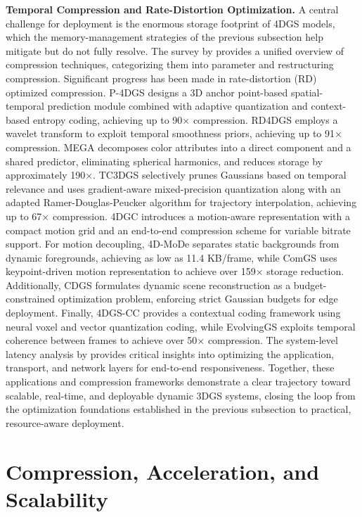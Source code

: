 \documentclass[11pt]{article}
\begin{document}
\textbf{Temporal Compression and Rate-Distortion Optimization.} A central challenge for deployment is the enormous storage footprint of 4DGS models, which the memory-management strategies of the previous subsection help mitigate but do not fully resolve. The survey by \cite{ref416} provides a unified overview of compression techniques, categorizing them into parameter and restructuring compression. Significant progress has been made in rate-distortion (RD) optimized compression. P-4DGS \cite{ref417} designs a 3D anchor point-based spatial-temporal prediction module combined with adaptive quantization and context-based entropy coding, achieving up to 90× compression. RD4DGS \cite{ref418} employs a wavelet transform to exploit temporal smoothness priors, achieving up to 91× compression. MEGA \cite{ref419} decomposes color attributes into a direct component and a shared predictor, eliminating spherical harmonics, and reduces storage by approximately 190×. TC3DGS \cite{ref420} selectively prunes Gaussians based on temporal relevance and uses gradient-aware mixed-precision quantization along with an adapted Ramer-Douglas-Peucker algorithm for trajectory interpolation, achieving up to 67× compression. 4DGC \cite{ref395} introduces a motion-aware representation with a compact motion grid and an end-to-end compression scheme for variable bitrate support. For motion decoupling, 4D-MoDe \cite{ref421} separates static backgrounds from dynamic foregrounds, achieving as low as 11.4 KB/frame, while ComGS \cite{ref422} uses keypoint-driven motion representation to achieve over 159× storage reduction. Additionally, CDGS \cite{ref423} formulates dynamic scene reconstruction as a budget-constrained optimization problem, enforcing strict Gaussian budgets for edge deployment. Finally, 4DGS-CC \cite{ref424} provides a contextual coding framework using neural voxel and vector quantization coding, while EvolvingGS \cite{ref425} exploits temporal coherence between frames to achieve over 50× compression. The system-level latency analysis by \cite{ref426} provides critical insights into optimizing the application, transport, and network layers for end-to-end responsiveness. Together, these applications and compression frameworks demonstrate a clear trajectory toward scalable, real-time, and deployable dynamic 3DGS systems, closing the loop from the optimization foundations established in the previous subsection to practical, resource-aware deployment.

\section{Compression, Acceleration, and Scalability}
\end{document}
